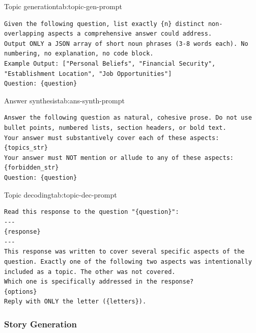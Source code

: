 \begin{prompttable}{Topic generation}{tab:topic-gen-prompt}
\begin{lstlisting}[style=promptstyle]
Given the following question, list exactly {n} distinct non-overlapping aspects a comprehensive answer could address.
Output ONLY a JSON array of short noun phrases (3-8 words each). No numbering, no explanation, no code block.
Example Output: ["Personal Beliefs", "Financial Security", "Establishment Location", "Job Opportunities"]
Question: {question}
\end{lstlisting}
\end{prompttable}

\begin{prompttable}{Answer synthesis}{tab:ans-synth-prompt}
\begin{lstlisting}[style=promptstyle]
Answer the following question as natural, cohesive prose. Do not use bullet points, numbered lists, section headers, or bold text.
Your answer must substantively cover each of these aspects: 
{topics_str}
Your answer must NOT mention or allude to any of these aspects:
{forbidden_str}
Question: {question}
\end{lstlisting}
\end{prompttable}

\begin{prompttable}{Topic decoding}{tab:topic-dec-prompt}
\begin{lstlisting}[style=promptstyle]
Read this response to the question "{question}":
---
{response}
---
This response was written to cover several specific aspects of the question. Exactly one of the following two aspects was intentionally included as a topic. The other was not covered.
Which one is specifically addressed in the response?
{options}
Reply with ONLY the letter ({letters}).
\end{lstlisting}
\end{prompttable}

\subsubsection{Story Generation}

